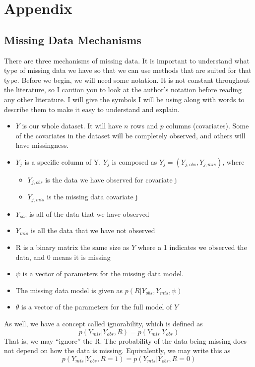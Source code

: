 \chapter{Appendix}
\section{Missing Data Mechanisms}
\label{app:apdx}
There are three mechanisms of missing data. It is important to understand what type of missing data we have so that we can use methods that are suited for that type. 
Before we begin, we will need some notation. It is not constant throughout the literature, so I caution you to look at the author's notation before reading any other literature. I will give the symbols I will be using along with words to describe them to make it easy to understand and explain.
\begin{itemize}
\item $Y$ is our whole dataset. It will have $n$ rows and $p$ columns (covariates). Some of the covariates in the dataset will be completely observed, and others will have missingness.
\item $Y_j$ is a specific column of Y. $Y_j$ is composed as $Y_j=(Y_{j,obs},Y_{j,mis})$, where
	\begin{itemize}
	\item $Y_{j,obs}$ is the data we have observed for covariate j
	\item $Y_{j,mis}$ is the missing data covariate j
\end{itemize} 
\item $Y_{obs}$ is all of the data that we have observed
\item $Y_{mis}$ is all the data that we have not observed
\item R is a binary matrix the same size as $Y$ where a 1 indicates we observed the data, and 0 means it is missing
\item $\psi$ is a vector of parameters for the missing data model. 
\item The missing data model is given as $p(R|Y_{obs},Y_{mis},\psi)$
\item $\theta$ is a vector of the parameters for the full model of $Y$
\end{itemize}
As well, we have a concept called ignorability, which is defined as
$$p(Y_{mis}|Y_{obs},R)= p(Y_{mis}|Y_{obs})$$
That is, we may ``ignore'' the R. The probability of the data being missing does not depend on how the data is missing. Equivalently, we may write this as
$$p(Y_{mis}|Y_{obs},R=1)= p(Y_{mis}|Y_{obs},R=0)$$
